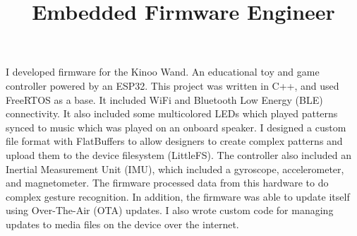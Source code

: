 \title{\textbf{Embedded Firmware Engineer}}
\begin{position}
I developed firmware for the Kinoo Wand. An educational toy and
game controller powered by an ESP32. This project was written in C++, and used
FreeRTOS as a base. It included WiFi and Bluetooth Low Energy (BLE)
connectivity. It also included some multicolored LEDs which played patterns
synced to music which was played on an onboard speaker. I designed a custom file
format with FlatBuffers to allow designers to create complex patterns and upload
them to the device filesystem (LittleFS). The controller also included an
Inertial Measurement Unit (IMU), which included a gyroscope, accelerometer, and
magnetometer. The firmware processed data from this hardware to do complex
gesture recognition. In addition, the firmware was able to update itself using
Over-The-Air (OTA) updates. I also wrote custom code for managing updates to
media files on the device over the internet.
\end{position}

